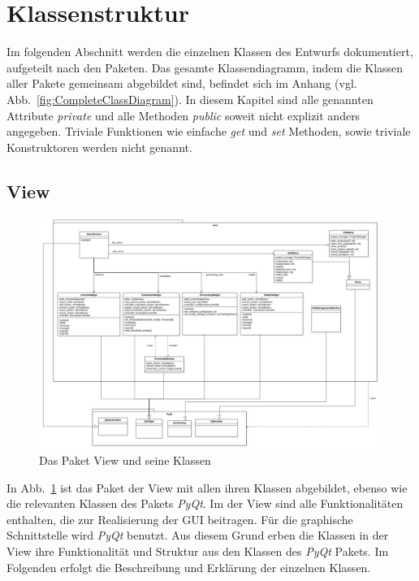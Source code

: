 \documentclass{article}
\begin{document}
\newpage
\section{Klassenstruktur}
Im folgenden Abschnitt werden die einzelnen Klassen des Entwurfs dokumentiert, aufgeteilt nach den Paketen. Das gesamte Klassendiagramm, indem die Klassen aller Pakete gemeinsam abgebildet sind, befindet sich im Anhang (vgl. Abb.~\ref{fig:CompleteClassDiagram}). In diesem Kapitel sind alle genannten Attribute \emph{private} und alle Methoden \emph{public} soweit nicht explizit anders angegeben. Triviale Funktionen wie einfache \emph{get} und \emph{set} Methoden, sowie triviale Konstruktoren werden nicht genannt.

\subsection{View}
\begin{figure}[H]%
    \centering
    \includegraphics[width=13cm]{docs/entwurf/Entwurf_dokument/img/Alissa/ViewUpdated.png}
    \caption{Das Paket View und seine Klassen}
    \label{fig:classDiagrammView}
\end{figure}
In Abb.~\ref{fig:classDiagrammView} ist das Paket der View mit allen ihren Klassen abgebildet, ebenso wie die relevanten Klassen des Pakets \emph{PyQt}.
Im der View sind alle Funktionalitäten enthalten, die zur Realisierung der GUI beitragen. Für die graphische Schnittstelle wird \emph{PyQt} benutzt. Aus diesem Grund erben die Klassen in der View ihre Funktionalität und Struktur aus den Klassen des \emph{PyQt} Pakets. Im Folgenden erfolgt die Beschreibung und Erklärung der einzelnen Klassen.

\newpage
\end{document}
